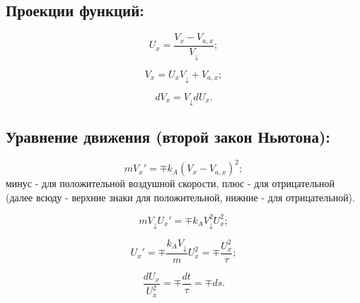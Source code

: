 \subsection{Проекции функций:}

$$U_x = \frac{V_x - V_{a,x}}{V_\downarrow};$$

$$V_x = U_xV_\downarrow + V_{a,x};$$

$$dV_x = V_\downarrow dU_x.$$

\subsection{Уравнение движения (второй закон Ньютона):}

$$mV_x' = \mp k_A(V_x - V_{a,x})^2;$$
минус - для положительной воздушной скорости, плюс - для отрицательной
(далее всюду - верхние знаки для положительной, нижние - для отрицательной).

$$mV_\downarrow U_x' = \mp k_A V_\downarrow^2 U_x^2;$$

$$U_x' = \mp \frac{k_A V_\downarrow}{m}U_x^2 = \mp \frac{U_x^2}{\tau};$$

$$\frac{dU_x}{U_x^2} = \mp \frac{dt}{\tau} = \mp ds.$$